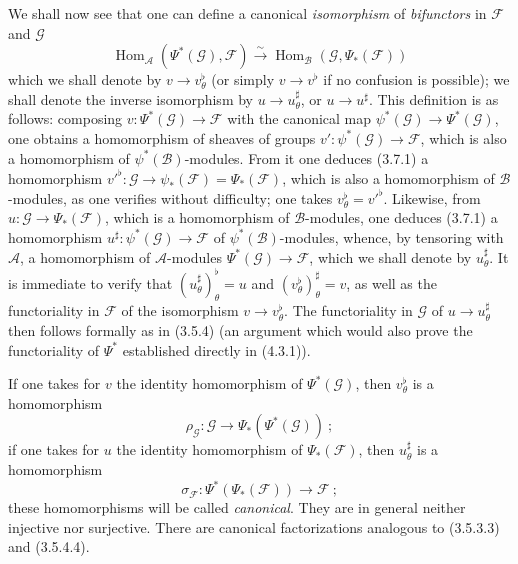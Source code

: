 \begin{env}[4.4.3]
\label{0.4.4.3}
We shall now see that one can define a canonical \emph{isomorphism}
of \emph{bifunctors} in $\mathcal{F}$ and $\mathcal{G}$
\[
  \operatorname{Hom}_{\mathcal{A}}(\Psi^*(\mathcal{G}),\mathcal{F})
  \xrightarrow{\sim}
  \operatorname{Hom}_{\mathcal{B}}(\mathcal{G},\Psi_*(\mathcal{F}))
  \tag{4.4.3.1}\label{0.4.4.3.1}
\]
which we shall denote by $v\to v_\theta^\flat$ (or simply
$v\to v^\flat$ if no confusion is possible); we shall denote the
inverse isomorphism by $u\to u_\theta^\sharp$, or $u\to u^\sharp$.
This definition is as follows: composing
$v:\Psi^*(\mathcal{G})\to\mathcal{F}$ with the canonical map
$\psi^*(\mathcal{G})\to\Psi^*(\mathcal{G})$, one obtains a homomorphism of
sheaves of groups $v':\psi^*(\mathcal{G})\to\mathcal{F}$, which is also a
homomorphism of $\psi^*(\mathcal{B})$-modules. From it one deduces (3.7.1) a
homomorphism
${v'}^\flat:\mathcal{G}\to\psi_*(\mathcal{F})=\Psi_*(\mathcal{F})$, which is
also a homomorphism of $\mathcal{B}$-modules, as one
verifies without difficulty; one takes $v_\theta^\flat={v'}^\flat$. Likewise, from
$u:\mathcal{G}\to\Psi_*(\mathcal{F})$, which is a homomorphism of
$\mathcal{B}$-modules, one deduces (3.7.1) a homomorphism
$u^\sharp:\psi^*(\mathcal{G})\to\mathcal{F}$ of
$\psi^*(\mathcal{B})$-modules, whence, by tensoring with $\mathcal{A}$, a
homomorphism of $\mathcal{A}$-modules
$\Psi^*(\mathcal{G})\to\mathcal{F}$, which we shall denote by
$u_\theta^\sharp$. It is immediate to verify that
$(u_\theta^\sharp)_\theta^\flat=u$ and
$(v_\theta^\flat)_\theta^\sharp=v$, as well as the functoriality in
$\mathcal{F}$ of the isomorphism $v\to v_\theta^\flat$. The
functoriality in $\mathcal{G}$ of $u\to u_\theta^\sharp$ then follows
formally as in (3.5.4) (an argument which would also prove the
functoriality of $\Psi^*$ established directly in (4.3.1)).

If one takes for $v$ the identity homomorphism of $\Psi^*(\mathcal{G})$,
then $v_\theta^\flat$ is a homomorphism
\[
  \rho_{\mathcal{G}}:\mathcal{G}\longrightarrow
  \Psi_*(\Psi^*(\mathcal{G}))~;
  \tag{4.4.3.2}\label{0.4.4.3.2}
\]
if one takes for $u$ the identity homomorphism of $\Psi_*(\mathcal{F})$,
then $u_\theta^\sharp$ is a homomorphism
\[
  \sigma_{\mathcal{F}}:\Psi^*(\Psi_*(\mathcal{F}))
  \longrightarrow\mathcal{F}~;
  \tag{4.4.3.3}\label{0.4.4.3.3}
\]
these homomorphisms will be called \emph{canonical}. They are in general neither
injective nor surjective. There are canonical factorizations analogous to
(3.5.3.3) and (3.5.4.4).


\end{env}
